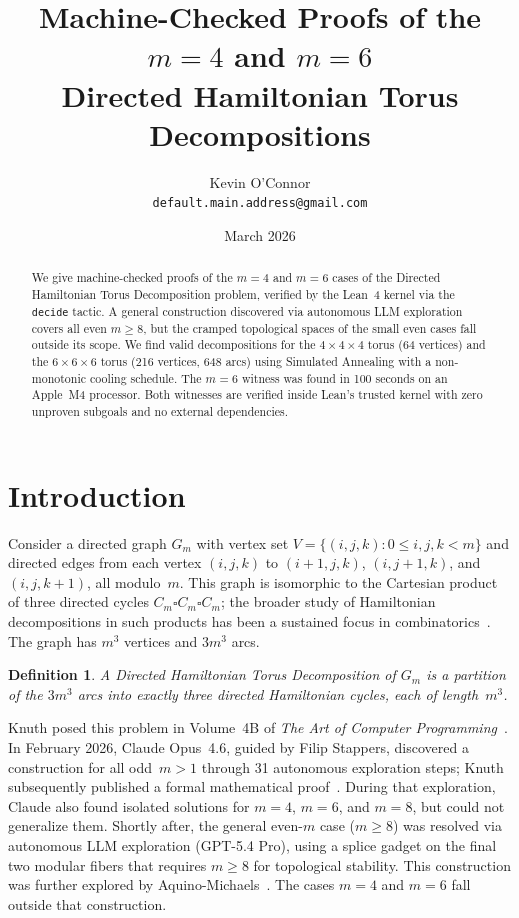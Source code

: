 \documentclass[11pt]{article}
\title{Machine-Checked Proofs of the $m=4$ and $m=6$ \\
Directed Hamiltonian Torus Decompositions}
\author{
  Kevin O'Connor\\
  \texttt{default.main.address@gmail.com}
}
\date{March 2026}
\theoremstyle{plain}
\newtheorem{definition}{Definition}
\begin{document}
\maketitle

\begin{abstract}
We give machine-checked proofs of the $m=4$ and $m=6$ cases of the Directed
Hamiltonian Torus Decomposition problem, verified by the Lean~4 kernel via
the \texttt{decide} tactic. A general construction discovered via
autonomous LLM exploration covers all even $m \ge 8$, but the cramped
topological spaces of the small even cases fall outside its scope.
We find valid decompositions for the $4 \times 4 \times 4$ torus
(64 vertices) and the $6 \times 6 \times 6$ torus (216 vertices, 648 arcs)
using Simulated Annealing with a non-monotonic cooling schedule. The $m=6$
witness was found in 100 seconds on an Apple~M4 processor. Both witnesses
are verified inside Lean's trusted kernel with zero unproven subgoals and
no external dependencies.
\end{abstract}

\section{Introduction}

Consider a directed graph $G_m$ with vertex set
$V = \{(i, j, k) : 0 \le i, j, k < m\}$ and directed edges from each vertex
$(i,j,k)$ to $(i{+}1, j, k)$, $(i, j{+}1, k)$, and $(i, j, k{+}1)$, all
modulo~$m$. This graph is isomorphic to the Cartesian product of three
directed cycles $C_m \square C_m \square C_m$; the broader study of
Hamiltonian decompositions in such products has been a sustained focus
in combinatorics~\cite{darijani2025}. The graph has $m^3$ vertices and
$3m^3$ arcs.

\begin{definition}
A \emph{Directed Hamiltonian Torus Decomposition} of $G_m$ is a partition of
the $3m^3$ arcs into exactly three directed Hamiltonian cycles, each of
length~$m^3$.
\end{definition}

Knuth posed this problem in Volume~4B of \emph{The Art of Computer
Programming}~\cite{knuth2026}. In February 2026, Claude Opus~4.6, guided
by Filip Stappers, discovered a construction for all odd~$m > 1$ through
31 autonomous exploration steps; Knuth subsequently published a formal
mathematical proof~\cite{knuth2026}. During that exploration, Claude also
found isolated solutions for $m = 4$, $m = 6$, and $m = 8$, but could
not generalize them. Shortly after, the general even-$m$ case ($m \ge 8$)
was resolved via autonomous LLM exploration (GPT-5.4 Pro), using a splice
gadget on the final two modular fibers that requires $m \ge 8$ for
topological stability. This construction was further explored by
Aquino-Michaels~\cite{aquino2026}.
The cases $m = 4$ and $m = 6$ fall outside that construction.
\end{document}

